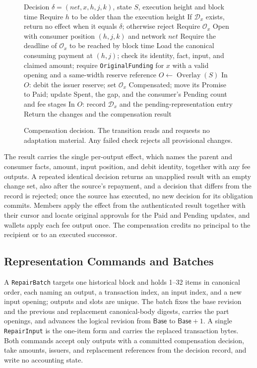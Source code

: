\begin{figure}[t]
  \small
  \begin{algorithmic}[1]
    \REQUIRE Decision $\delta=(\mathit{net},x,h,j,k)$, state $S$,
    execution height and block time
    \STATE Require $h$ to be older than the execution height
    \STATE If $\mathcal D_x$ exists, return no effect when it equals
    $\delta$; otherwise reject
    \STATE Require $\mathcal O_x$ Open with consumer position $(h,j,k)$
    and network $\mathit{net}$
    \STATE Require the deadline of $\mathcal O_x$ to be reached by block time
    \STATE Load the canonical consuming payment at $(h,j)$; check its
    identity, fact, input, and claimed amount; require
    \texttt{OriginalFunding} for $x$ with a valid opening and a
    same-width reserve reference
    \STATE $O\gets\operatorname{Overlay}(S)$
    \STATE In $O$: debit the issuer reserve; set $\mathcal O_x$ Compensated;
    move its Promise to Paid; update Spent, the gap, and the consumer's
    Pending count and fee stages
    \STATE In $O$: record $\mathcal D_x$ and the pending-representation
    entry
    \STATE Return the changes and the compensation result
  \end{algorithmic}
  \caption{Compensation decision. The transition reads and requests no
    adaptation material. Any failed check rejects all provisional
    changes.}
  \label{fig:protocol-decision}
\end{figure}

The result carries the single per-output effect, which names the parent and consumer facts, amount, input position, and debit identity, together with any fee outputs. A repeated identical decision returns an unapplied result with an empty change set, also after the source's repayment, and a decision that differs from the record is rejected; once the source has executed, no new decision for its obligation commits. Members apply the effect from the authenticated result together with their cursor and locate original approvals for the Paid and Pending updates, and wallets apply each fee output once. The compensation credits no principal to the recipient or to an executed successor.

\subsection{Representation Commands and Batches}
\label{sec:protocol-batch}

A \texttt{RepairBatch} targets one historical block and holds 1--32 items in canonical order, each naming an output, a transaction index, an input index, and a new input opening; outputs and slots are unique. The batch fixes the base revision and the previous and replacement canonical-body digests, carries the part openings, and advances the logical revision from $\mathsf{Base}$ to $\mathsf{Base}+1$. A single \texttt{RepairInput} is the one-item form and carries the replaced transaction bytes. Both commands accept only outputs with a committed compensation decision, take amounts, issuers, and replacement references from the decision record, and write no accounting state.

